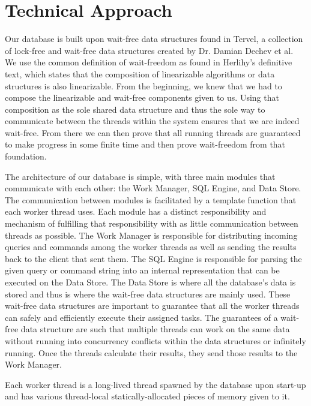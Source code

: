 \documentclass[letter,11pt]{article}
\begin{document}
\section{Technical Approach}
Our database is built upon wait-free data structures found in Tervel, a collection of
lock-free and wait-free data structures created by Dr. Damian Dechev et al\cite{web:tervel}. We use
the common definition of wait-freedom as found in Herlihy's definitive text\cite{herlihy:waitfree}, which
states that the composition of linearizable algorithms or data structures
is also linearizable. From the beginning, we knew that we had to compose 
the linearizable and wait-free components given to us. Using that composition 
as the sole shared data structure and thus the sole way to communicate 
between the threads within the system ensures that we are indeed wait-free.
From there we can then prove that all running threads are guaranteed 
to make progress in some finite time and then prove wait-freedom from that foundation.
\par\vspace{\baselineskip}
The architecture of our database is simple, with three main modules that 
communicate with each other: the Work Manager, SQL Engine, and Data Store. The communication
between modules is facilitated by a template function that each worker thread uses.
Each module has a distinct responsibility and mechanism of fulfilling that responsibility with as 
little communication between threads as possible. The Work Manager is responsible for distributing
incoming queries and commands among the worker threads as well as sending the results back to the 
client that sent them. The SQL Engine is responsible for parsing the
given query or command string into an internal representation that can be executed on the Data Store.
The Data Store is where all the database's data is stored and thus is where the wait-free data
structures are mainly used. These wait-free data structures are important to guarantee that all
the worker threads can safely and efficiently execute their assigned tasks. The guarantees of a 
wait-free data structure are such that multiple threads can work on the same data without 
running into concurrency conflicts within the data structures or infinitely running. Once 
the threads calculate their results, they send those results to the Work Manager.
\par\vspace{\baselineskip}
Each worker thread is a long-lived thread spawned by the database upon start-up and has various
thread-local statically-allocated pieces of memory given to it.
\end{document}
